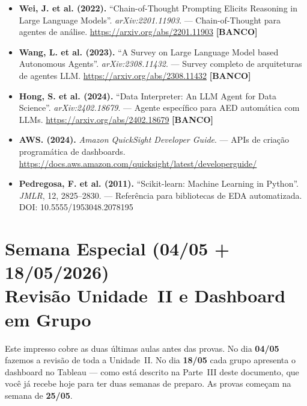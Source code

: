 \begin{itemize}
  \item \textbf{Wei, J. et al. (2022).} ``Chain-of-Thought Prompting Elicits Reasoning in Large Language Models''. \textit{arXiv:2201.11903}. --- Chain-of-Thought para agentes de análise. \url{https://arxiv.org/abs/2201.11903} \textbf{[BANCO]}

  \item \textbf{Wang, L. et al. (2023).} ``A Survey on Large Language Model based Autonomous Agents''. \textit{arXiv:2308.11432}. --- Survey completo de arquiteturas de agentes LLM. \url{https://arxiv.org/abs/2308.11432} \textbf{[BANCO]}

  \item \textbf{Hong, S. et al. (2024).} ``Data Interpreter: An LLM Agent for Data Science''. \textit{arXiv:2402.18679}. --- Agente específico para AED automática com LLMs. \url{https://arxiv.org/abs/2402.18679} \textbf{[BANCO]}

  \item \textbf{AWS. (2024).} \textit{Amazon QuickSight Developer Guide}. --- APIs de criação programática de dashboards. \url{https://docs.aws.amazon.com/quicksight/latest/developerguide/}

  \item \textbf{Pedregosa, F. et al. (2011).} ``Scikit-learn: Machine Learning in Python''. \textit{JMLR}, 12, 2825--2830. --- Referência para bibliotecas de EDA automatizada. DOI: 10.5555/1953048.2078195
\end{itemize}

\clearpage
%

\chapter{Semana Especial (04/05 + 18/05/2026)\\[4pt]Revisão Unidade~II e Dashboard em Grupo}

Este impresso cobre as duas últimas aulas antes das provas. No dia \textbf{04/05} fazemos a revisão de toda a Unidade~II. No dia \textbf{18/05} cada grupo apresenta o dashboard no Tableau --- como está descrito na Parte~III deste documento, que você já recebe hoje para ter duas semanas de preparo. As provas começam na semana de \textbf{25/05}.

